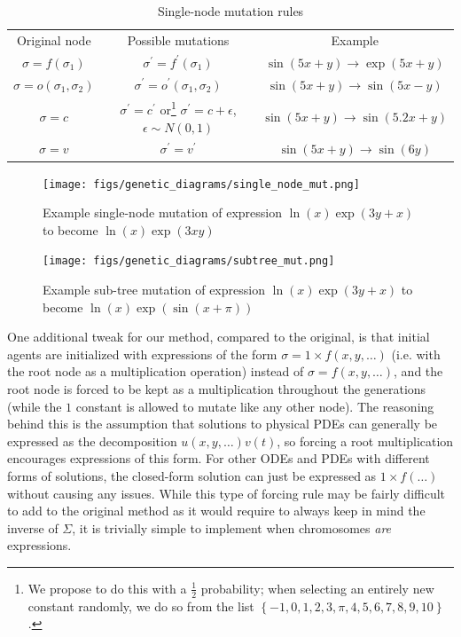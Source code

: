 \documentclass[aps,reprint,superscriptaddress,nofootinbib]{revtex4-2}
\begin{document}
\begin{table}[t]
    \centering
    \caption{Single-node mutation rules}
    \begin{tabular}{c|c|c}
        Original node & Possible mutations & Example
        \\
        \(\sigma = f(\sigma_1)\) & \(\sigma^\prime = f^\prime(\sigma_1)\) & \(\sin(5x+y) \to \exp(5x+y)\)
        \\
        \(\sigma = o(\sigma_1, \sigma_2)\) & \(\sigma^\prime = o^\prime(\sigma_1, \sigma_2)\) & \(\sin(5x+y) \to \sin(5x-y)\)
        \\
        \(\sigma = c\) & \(\sigma^\prime = c^\prime\) or\footnote{We propose to do this with a \(\frac{1}{2}\) probability; when selecting an entirely new constant randomly, we do so from the list \(\left\{-1, 0, 1, 2, 3, \pi, 4, 5, 6, 7, 8, 9, 10\right\}\).} \(\sigma^\prime = c + \epsilon\), \(\epsilon \sim N(0,1)\) & \(\sin(5x+y) \to \sin(5.2x+y)\)
        \\
        \(\sigma = v\) & \(\sigma^\prime = v^\prime\) & \(\sin(5x+y) \to \sin(6y)\)
    \end{tabular}
    \label{tab:single_node_mut}
\end{table}

\begin{figure}[htp]
    \centering
    \texttt{[image: figs/genetic\_diagrams/single\_node\_mut.png]}
    \caption{Example single-node mutation of expression \(\ln(x)\exp(3y+x)\) to become \(\ln(x)\exp(3xy)\)}
    \label{fig:single_node_mut}
\end{figure}

\begin{figure}[htp]
    \centering
    \texttt{[image: figs/genetic\_diagrams/subtree\_mut.png]}
    \caption{Example sub-tree mutation of expression \(\ln(x)\exp(3y+x)\) to become \(\ln(x)\exp(\sin(x+\pi))\)}
    \label{fig:subtree_mut}
\end{figure}

One additional tweak for our method, compared to the original, is that initial agents are initialized with expressions of the form \(\sigma = 1 \times f(x, y, \ldots)\) (i.e. with the root node as a multiplication operation) instead of \(\sigma = f(x, y, \ldots)\), and the root node is forced to be kept as a multiplication throughout the generations (while the \(1\) constant is allowed to mutate like any other node). The reasoning behind this is the assumption that solutions to physical PDEs can generally be expressed as the decomposition \(u(x, y, \ldots)v(t)\), so forcing a root multiplication encourages expressions of this form. For other ODEs and PDEs with different forms of solutions, the closed-form solution can just be expressed as \(1 \times f(\ldots)\) without causing any issues. While this type of forcing rule may be fairly difficult to add to the original method as it would require to always keep in mind the inverse of \(\Sigma\), it is trivially simple to implement when chromosomes \textit{are} expressions.
\end{document}
